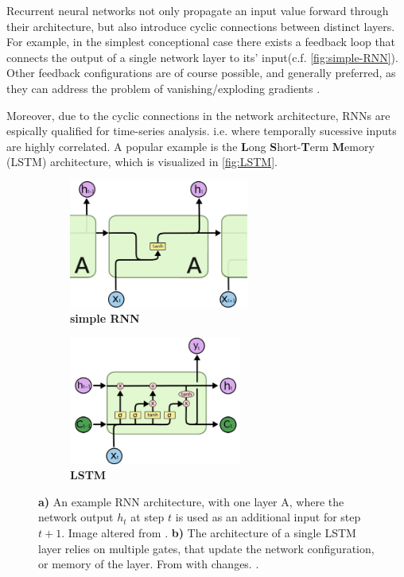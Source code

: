 Recurrent neural networks not only propagate an input value forward through their architecture, but also introduce cyclic connections between distinct layers. For
example, in the simplest conceptional case there exists a feedback loop that connects the output of a single network layer to its' input(c.f. 
\autoref{fig:simple-RNN}). Other feedback configurations are of course possible, and generally preferred, as they can address the problem of vanishing/exploding 
gradients \cite{hochreiter1991untersuchungen}. 

Moreover, due to the cyclic connections in the network architecture, RNNs are espically qualified for time-series analysis. i.e. where temporally sucessive inputs
are highly correlated. A popular example is the \textbf{L}ong \textbf{S}hort-\textbf{T}erm \textbf{M}emory (LSTM) architecture, which is visualized in 
\autoref{fig:LSTM}.

\begin{figure}
	\centering
	\begin{subfigure}[h]{0.45\linewidth}
	\includegraphics[height=4.2cm]{imgs/simple_RNN.png}
	\caption{\textbf{simple RNN}\label{fig:simple-RNN}}
	\end{subfigure}
	\begin{subfigure}[h]{0.45\linewidth}
	\includegraphics[height=4.2cm]{imgs/LSTM.png}
	\caption{\textbf{LSTM}\label{fig:LSTM}}
	\end{subfigure}
	\caption*{\textbf{a)} An example RNN architecture, with one layer A, where the network output $h_t$ at step $t$ is used as an additional input for step $t+1$. 
	Image altered from \cite{NN-images}. \textbf{b)} The architecture of a single LSTM layer relies on multiple gates, that update the network configuration, or 
	memory of the layer. From \cite{NN-images} with changes. \label{fig:NN-architectures}.}
\end{figure}

